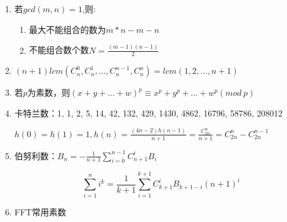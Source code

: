 \begin{enumerate}
\item 若$gcd(m,n)=1$,则:

\begin{enumerate}
\item 最大不能组合的数为$m*n-m-n$
\item 不能组合数个数$N=\frac{(m-1)(n-1)}{2}$
\end{enumerate}

\item $(n+1)lcm(C_n^0,C_n^1,...,C_n^{n-1},C_n^{n})=lcm(1,2,...,n+1)$

\item 若$p$为素数，则$(x+y+...+w)^p\equiv x^p+y^p+...+w^p(mod\ p)$

\item 卡特兰数：1, 1, 2, 5, 14, 42, 132, 429, 1430, 4862, 16796, 58786, 208012

$h(0)=h(1)=1,h(n)=\frac{(4n-2)h(n-1)}{n+1}=\frac{C_{2n}^n}{n+1}=C_{2n}^n-C_{2n}^{n-1}$

\item 伯努利数：$B_n = -\frac{1}{n+1} \sum_{i=0}^{n-1} C_{n+1}^i B_i$

$$\sum_{i=1}^n i^k = \frac{1}{k+1} \sum_{i=1}^{k+1}C_{k+1}^i B_{k+1-i}(n+1)^i$$

\item FFT常用素数


\end{enumerate}

